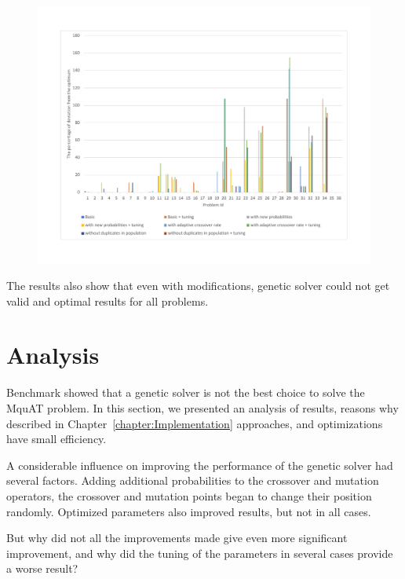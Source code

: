 \begin{figure}
	\centering
	\includegraphics[width=\textwidth]{images/EnergyPercentage.pdf}
	\caption[]{}
	\label{fig:EnergyPercentage}
\end{figure}

The results also show that even with modifications, genetic solver could not get valid and optimal results for all problems.


\section{Analysis}
Benchmark showed that a genetic solver is not the best choice to solve the MquAT problem.
In this section, we presented an analysis of results, reasons why described in Chapter~\ref{chapter:Implementation} approaches, and optimizations have small efficiency.

A considerable influence on improving the performance of the genetic solver had several factors. Adding additional probabilities to the crossover and mutation operators, the crossover and mutation points began to change their position randomly.
Optimized parameters also improved results, but not in all cases.

But why did not all the improvements made give even more significant improvement, and why did the tuning of the parameters in several cases provide a worse result?

